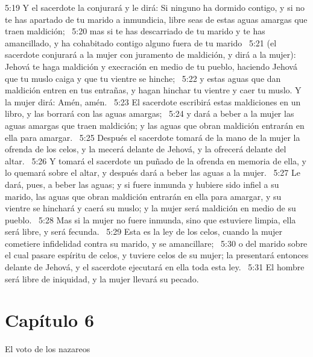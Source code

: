 5:19 Y el sacerdote la conjurará y le dirá: Si ninguno ha dormido contigo, y si no te has apartado de tu marido a inmundicia, libre seas de estas aguas amargas que traen maldición;  
5:20 mas si te has descarriado de tu marido y te has amancillado, y ha cohabitado contigo alguno fuera de tu marido  
5:21 (el sacerdote conjurará a la mujer con juramento de maldición, y dirá a la mujer): Jehová te haga maldición y execración en medio de tu pueblo, haciendo Jehová que tu muslo caiga y que tu vientre se hinche;  
5:22 y estas aguas que dan maldición entren en tus entrañas, y hagan hinchar tu vientre y caer tu muslo. Y la mujer dirá: Amén, amén.  
5:23 El sacerdote escribirá estas maldiciones en un libro, y las borrará con las aguas amargas;  
5:24 y dará a beber a la mujer las aguas amargas que traen maldición; y las aguas que obran maldición entrarán en ella para amargar.  
5:25 Después el sacerdote tomará de la mano de la mujer la ofrenda de los celos, y la mecerá delante de Jehová, y la ofrecerá delante del altar.  
5:26 Y tomará el sacerdote un puñado de la ofrenda en memoria de ella, y lo quemará sobre el altar, y después dará a beber las aguas a la mujer.  
5:27 Le dará, pues, a beber las aguas; y si fuere inmunda y hubiere sido infiel a su marido, las aguas que obran maldición entrarán en ella para amargar, y su vientre se hinchará y caerá su muslo; y la mujer será maldición en medio de su pueblo.  
5:28 Mas si la mujer no fuere inmunda, sino que estuviere limpia, ella será libre, y será fecunda.  
5:29 Esta es la ley de los celos, cuando la mujer cometiere infidelidad contra su marido, y se amancillare;  
5:30 o del marido sobre el cual pasare espíritu de celos, y tuviere celos de su mujer; la presentará entonces delante de Jehová, y el sacerdote ejecutará en ella toda esta ley.  
5:31 El hombre será libre de iniquidad, y la mujer llevará su pecado.  
\section*{Capítulo 6}
El voto de los nazareos  


